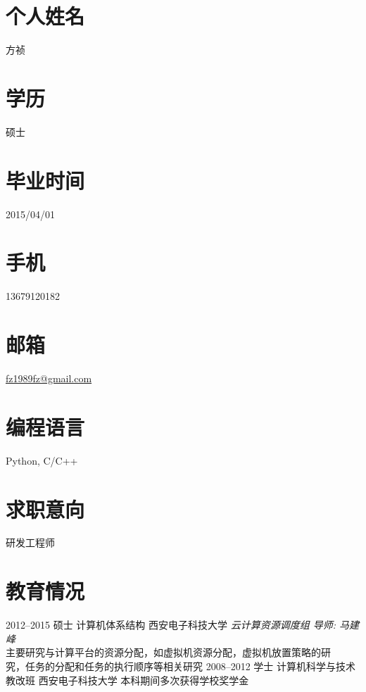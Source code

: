 \documentclass[]{friggeri-cv} %
\begin{document}


\begin{aside} %
\section{个人姓名}
方祯
\section{学历}
硕士
\section{毕业时间}
2015/04/01
\section{手机}
13679120182
\section{邮箱}
\href{mailto:fz1989fz@gmail.com}{fz1989fz@gmail.com}
\section{编程语言}
Python, C/C++
\section{求职意向}
研发工程师
\end{aside}

\section{教育情况}

\begin{entrylist}
\entry
{2012--2015}
{硕士 {\normalfont 计算机体系结构}}
{西安电子科技大学}
{\emph{云计算资源调度组 导师: 马建峰}\\
主要研究与计算平台的资源分配，如虚拟机资源分配，虚拟机放置策略的研\\
究，任务的分配和任务的执行顺序等相关研究}
\entry
{2008--2012}
{学士 {\normalfont 计算机科学与技术教改班}}
{西安电子科技大学}
{本科期间多次获得学校奖学金}
\end{entrylist}
\end{document}
